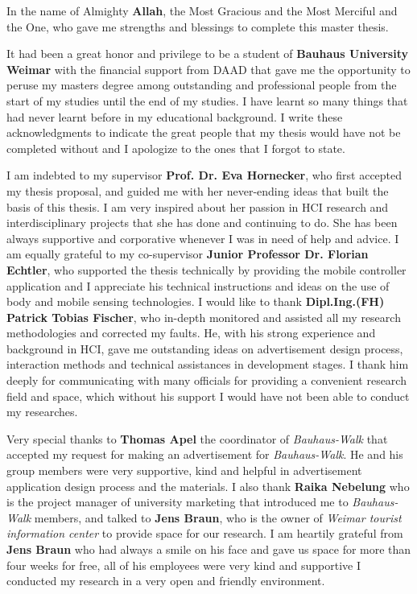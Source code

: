 
\begin{acknowledgements}
\addchaptertocentry{\acknowledgementname} %
 
 
In the name of Almighty \textbf{Allah}, the Most Gracious and the Most Merciful and the One, who gave me strengths and blessings to complete this master thesis. 

It had been a great honor and privilege to be a student of \textbf{Bauhaus University Weimar} with the financial support from DAAD that gave me the opportunity to peruse my masters degree among outstanding and professional people from the start of my studies until the end of my studies. I have learnt so many things that had never learnt before in my educational background. I write these acknowledgments to indicate the great people that my thesis would have not be completed without and I apologize to the ones that I forgot to state. 

I am indebted to my supervisor \textbf{Prof. Dr. Eva Hornecker}, who first accepted my thesis proposal, and guided me with her never-ending ideas that built the basis of this thesis. I am very inspired about her passion in HCI research and interdisciplinary projects that she has done and continuing to do. She has been always supportive and corporative whenever I was in need of help and advice.
I am equally grateful to my co-supervisor \textbf{Junior Professor Dr. Florian Echtler}, who supported the thesis technically by providing the mobile controller application and I appreciate his technical instructions and ideas on the use of body and mobile sensing technologies.
I would like to thank \textbf{Dipl.Ing.(FH) Patrick Tobias Fischer}, who in-depth monitored and assisted all my research methodologies and corrected my faults. He, with his strong experience and background in HCI, gave me outstanding ideas on advertisement design process, interaction methods and technical assistances in development stages. I thank him deeply for communicating with many officials for providing a convenient research field and space, which without his support I would have not been able to conduct my researches.

Very special thanks to \textbf{Thomas Apel} the coordinator of  \emph{Bauhaus-Walk} that accepted my request for making an advertisement for \emph{Bauhaus-Walk}. He and his group members were very supportive, kind and helpful in advertisement application design process and the materials. I also thank \textbf{Raika Nebelung} who is the project manager of university marketing that introduced me to \emph{Bauhaus-Walk} members, and talked to \textbf{Jens Braun}, who is the owner of \emph{Weimar tourist information center} to provide space for our research. I am heartily grateful from \textbf{Jens Braun} who had always a smile on his face and gave us space for more than four weeks for free, all of his employees were very kind and supportive I conducted my research in a very open and friendly environment. 


\end{acknowledgements}
